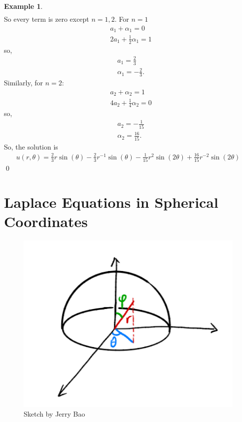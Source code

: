 \documentclass{article}
\theoremstyle{definition}
\newtheorem{exmp}{Example}[section]
\newcommand{\f}[2]{\frac{#1}{#2}}
\begin{document}
\begin{exmp}
\begin{align*}
	\end{align*}
	So every term is zero except $n = 1,2$. For $n=1$
	\begin{align*}
	&a_1 + \alpha_1 = 0\\
	&2a_1 + \frac{1}{2}\alpha_1 = 1
	\end{align*}
	so,
	\begin{align*}
	&a_1 = \frac{2}{3}\\
	&\alpha_1 = -\frac{2}{3}.
	\end{align*}
	Similarly, for $n=2$:
	\begin{align*}
	&a_2 + \alpha_2 = 1\\
	&4a_2 + \frac{1}{4}\alpha_2 = 0
	\end{align*}
	so,
	\begin{align*}
	&a_2 = -\frac{1}{15}\\
	&\alpha_2 = \frac{16}{15}.
	\end{align*}
	So, the solution is
	\begin{align*}
	\boxed{u(r,\theta) = \frac{2}{3}r\sin(\theta) - \frac{2}{3}r^{-1}\sin(\theta) - \f{1}{15}r^2\sin(2\theta) + \f{16}{15}r^{-2}\sin(2\theta)}
	\end{align*}\qed
\end{exmp}


\newpage

\section{Laplace Equations in Spherical Coordinates}

\begin{figure}[h!]
	\centering
	\includegraphics[scale=1]{sphere.png}
	\caption{Sketch by Jerry Bao}
\end{figure}
\end{document}
